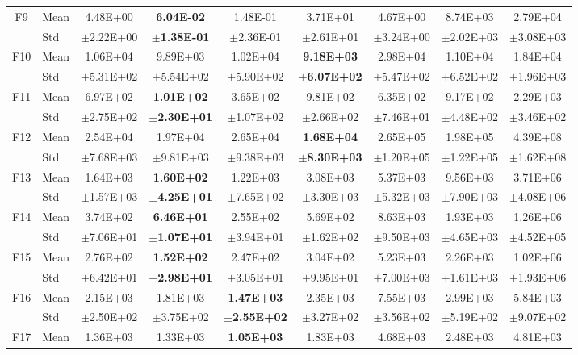 \begin{table}[htbp]
{\begin{tabular}{clccccccc}
F9 & Mean & 4.48E+00 & \textbf{6.04E-02} & 1.48E-01 & 3.71E+01 & 4.67E+00 & 8.74E+03 & 2.79E+04 \\
 & Std & $\pm$2.22E+00 & $\pm$\textbf{1.38E-01} & $\pm$2.36E-01 & $\pm$2.61E+01 & $\pm$3.24E+00 & $\pm$2.02E+03 & $\pm$3.08E+03 \\
F10 & Mean & 1.06E+04 & 9.89E+03 & 1.02E+04 & \textbf{9.18E+03} & 2.98E+04 & 1.10E+04 & 1.84E+04 \\
 & Std & $\pm$5.31E+02 & $\pm$5.54E+02 & $\pm$5.90E+02 & $\pm$\textbf{6.07E+02} & $\pm$5.47E+02 & $\pm$6.52E+02 & $\pm$1.96E+03 \\
F11 & Mean & 6.97E+02 & \textbf{1.01E+02} & 3.65E+02 & 9.81E+02 & 6.35E+02 & 9.17E+02 & 2.29E+03 \\
 & Std & $\pm$2.75E+02 & $\pm$\textbf{2.30E+01} & $\pm$1.07E+02 & $\pm$2.66E+02 & $\pm$7.46E+01 & $\pm$4.48E+02 & $\pm$3.46E+02 \\
F12 & Mean & 2.54E+04 & 1.97E+04 & 2.65E+04 & \textbf{1.68E+04} & 2.65E+05 & 1.98E+05 & 4.39E+08 \\
 & Std & $\pm$7.68E+03 & $\pm$9.81E+03 & $\pm$9.38E+03 & $\pm$\textbf{8.30E+03} & $\pm$1.20E+05 & $\pm$1.22E+05 & $\pm$1.62E+08 \\
F13 & Mean & 1.64E+03 & \textbf{1.60E+02} & 1.22E+03 & 3.08E+03 & 5.37E+03 & 9.56E+03 & 3.71E+06 \\
 & Std & $\pm$1.57E+03 & $\pm$\textbf{4.25E+01} & $\pm$7.65E+02 & $\pm$3.30E+03 & $\pm$5.32E+03 & $\pm$7.90E+03 & $\pm$4.08E+06 \\
F14 & Mean & 3.74E+02 & \textbf{6.46E+01} & 2.55E+02 & 5.69E+02 & 8.63E+03 & 1.93E+03 & 1.26E+06 \\
 & Std & $\pm$7.06E+01 & $\pm$\textbf{1.07E+01} & $\pm$3.94E+01 & $\pm$1.62E+02 & $\pm$9.50E+03 & $\pm$4.65E+03 & $\pm$4.52E+05 \\
F15 & Mean & 2.76E+02 & \textbf{1.52E+02} & 2.47E+02 & 3.04E+02 & 5.23E+03 & 2.26E+03 & 1.02E+06 \\
 & Std & $\pm$6.42E+01 & $\pm$\textbf{2.98E+01} & $\pm$3.05E+01 & $\pm$9.95E+01 & $\pm$7.00E+03 & $\pm$1.61E+03 & $\pm$1.93E+06 \\
F16 & Mean & 2.15E+03 & 1.81E+03 & \textbf{1.47E+03} & 2.35E+03 & 7.55E+03 & 2.99E+03 & 5.84E+03 \\
 & Std & $\pm$2.50E+02 & $\pm$3.75E+02 & $\pm$\textbf{2.55E+02} & $\pm$3.27E+02 & $\pm$3.56E+02 & $\pm$5.19E+02 & $\pm$9.07E+02 \\
F17 & Mean & 1.36E+03 & 1.33E+03 & \textbf{1.05E+03} & 1.83E+03 & 4.68E+03 & 2.48E+03 & 4.81E+03 \\

\end{tabular}}
\end{table}
